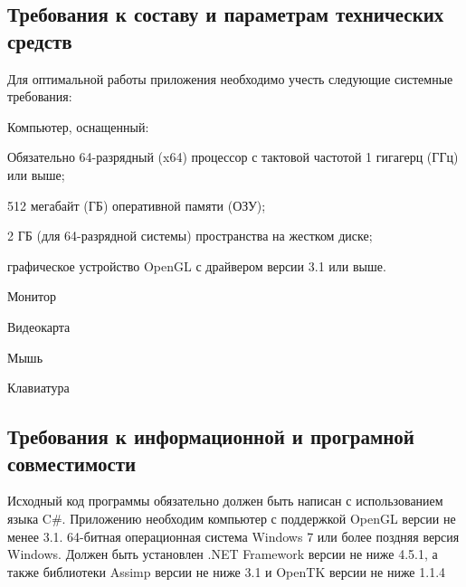 \subsection{Требования к составу и параметрам технических средств}
Для оптимальной работы приложения необходимо учесть следующие системные требования:
\begin{my_enumerate}
\item Компьютер, оснащенный:
    \begin{my_enumerate}
    \item Обязательно 64-разрядный (x64) процессор с тактовой частотой 1 гигагерц (ГГц) или выше;
    \item 512 мегабайт (ГБ) оперативной памяти (ОЗУ);
    \item 2 ГБ (для 64-разрядной системы) пространства на жестком диске;
    \item графическое устройство OpenGL с драйвером версии 3.1 или выше.
    \end{my_enumerate}
\item Монитор
\item Видеокарта
\item Мышь
\item Клавиатура
\end{my_enumerate}


\subsection{Требования к информационной и програмной совместимости}
Исходный код программы обязательно должен быть написан с использованием языка C\#. Приложению необходим компьютер с поддержкой OpenGL версии не менее 3.1. 64-битная операционная система Windows 7 или более поздняя версия Windows. Должен быть установлен .NET Framework версии не ниже 4.5.1, а также библиотеки Assimp версии не ниже 3.1 и OpenTK версии не ниже 1.1.4

